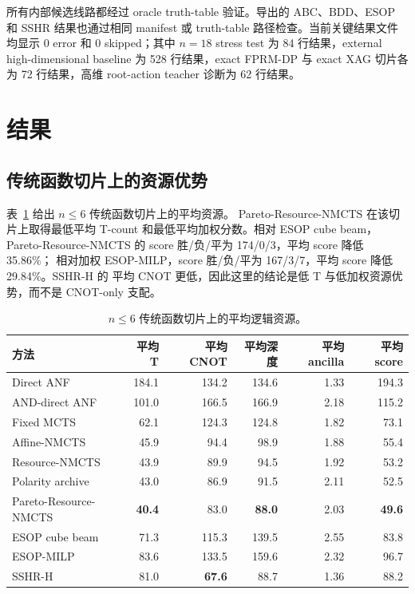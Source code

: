 \documentclass[UTF8,fontset=macnew,11pt]{ctexart}
\newcommand{\method}{Resource-NMCTS}
\newcommand{\paretomethod}{Pareto-Resource-NMCTS}
\begin{document}
所有内部候选线路都经过 oracle truth-table 验证。导出的 ABC、BDD、ESOP 和 SSHR
结果也通过相同 manifest 或 truth-table 路径检查。当前关键结果文件均显示 0 error
和 0 skipped；其中 $n=18$ stress test 为 84 行结果，external high-dimensional
baseline 为 528 行结果，exact FPRM-DP 与 exact XAG 切片各为 72 行结果，高维
root-action teacher 诊断为 62 行结果。

\section{结果}

\subsection{传统函数切片上的资源优势}

表~\ref{tab:traditional-resource-zh} 给出 $n\leq 6$ 传统函数切片上的平均资源。
\paretomethod{} 在该切片上取得最低平均 T-count 和最低平均加权分数。相对 ESOP cube
beam，\paretomethod{} 的 score 胜/负/平为 174/0/3，平均 score 降低 35.86\%；
相对加权 ESOP-MILP，score 胜/负/平为 167/3/7，平均 score 降低 29.84\%。SSHR-H 的
平均 CNOT 更低，因此这里的结论是低 T 与低加权资源优势，而不是 CNOT-only 支配。

\begin{table}[t]
\centering
\small
\caption{$n\leq 6$ 传统函数切片上的平均逻辑资源。}
\label{tab:traditional-resource-zh}
\begin{tabular}{lrrrrr}
\toprule
方法 & 平均 T & 平均 CNOT & 平均深度 & 平均 ancilla & 平均 score \\
\midrule
Direct ANF & 184.1 & 134.2 & 134.6 & 1.33 & 194.3 \\
AND-direct ANF & 101.0 & 166.5 & 166.9 & 2.18 & 115.2 \\
Fixed MCTS & 62.1 & 124.3 & 124.8 & 1.82 & 73.1 \\
Affine-NMCTS & 45.9 & 94.4 & 98.9 & 1.88 & 55.4 \\
\method{} & 43.9 & 89.9 & 94.5 & 1.92 & 53.2 \\
Polarity archive & 43.0 & 86.9 & 91.5 & 2.11 & 52.5 \\
\paretomethod{} & \textbf{40.4} & 83.0 & \textbf{88.0} & 2.03 & \textbf{49.6} \\
ESOP cube beam & 71.3 & 115.3 & 139.5 & 2.55 & 83.8 \\
ESOP-MILP & 83.6 & 133.5 & 159.6 & 2.32 & 96.7 \\
SSHR-H & 81.0 & \textbf{67.6} & 88.7 & 1.36 & 88.2 \\
\bottomrule
\end{tabular}
\end{table}
\end{document}
